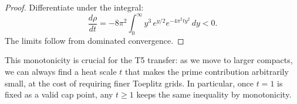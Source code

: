 \begin{proof}
Differentiate under the integral:
\begin{equation}
  \frac{d\rho}{dt} = -8\pi^2 \int_0^\infty y^3 \, e^{y/2} e^{-4\pi^2 t y^2} \, dy < 0.
\end{equation}
The limits follow from dominated convergence.
\end{proof}

This monotonicity is crucial for the T5 transfer: as we move to larger compacts, we can always find a heat scale $t$ that makes the prime contribution arbitrarily small, at the cost of requiring finer Toeplitz grids.
In particular, once $t=1$ is fixed as a valid cap point, any $t \ge 1$ keeps the same inequality by monotonicity.
